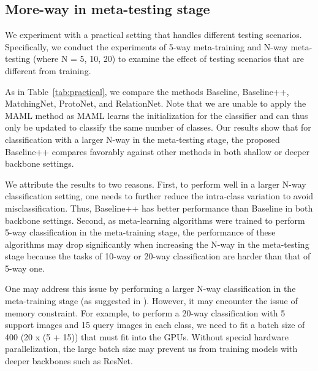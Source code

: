 \documentclass{article}
\newcommand{\tabref}[1]{Table~\ref{tab:#1}}
\begin{document}
\newpage



\subsection{More-way in meta-testing stage} 
We experiment with a practical setting that handles different testing scenarios. Specifically, we conduct the experiments of 5-way meta-training and N-way meta-testing (where N = 5, 10, 20) to examine the effect of testing scenarios that are different from training.

As in \tabref{practical}, we compare the methods Baseline, Baseline++, MatchingNet, ProtoNet, and RelationNet. Note that we are unable to apply the MAML method as MAML learns the initialization for the classifier and can thus only be updated to classify the same number of classes. Our results show that for classification with a larger N-way in the meta-testing stage, the proposed Baseline++ compares favorably against other methods in both shallow or deeper backbone settings.

We attribute the results to two reasons. First, to perform well in a larger N-way classification setting, one needs to further reduce the intra-class variation to avoid misclassification. Thus, Baseline++ has better performance than Baseline in both backbone settings. Second, as meta-learning algorithms were trained to perform 5-way classification in the meta-training stage, the performance of these algorithms may drop significantly when increasing the N-way in the meta-testing stage because the tasks of 10-way or 20-way classification are harder than that of 5-way one. 

One may address this issue by performing a larger N-way classification in the meta-training stage (as suggested in \cite{snell2017prototypical}). However, it may encounter the issue of memory constraint. For example, to perform a 20-way classification with 5 support images and 15 query images in each class, we need to fit a batch size of 400 (20 x (5 + 15)) that must fit into the GPUs. Without special hardware parallelization, the large batch size may prevent us from training models with deeper backbones such as ResNet. 
\end{document}
